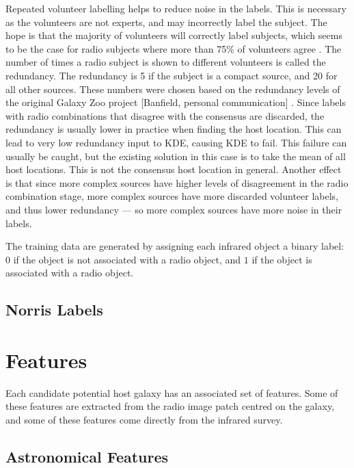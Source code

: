     Repeated volunteer labelling helps to reduce noise in the labels. This is
    necessary as the volunteers are not experts, and may incorrectly label the
    subject. The hope is that the majority of volunteers will correctly label
    subjects, which seems to be the case for radio subjects where more than
    75\% of volunteers agree \citep{banfield15}. The number of times a radio
    subject is shown to different volunteers is called the redundancy. The
    redundancy is 5 if the subject is a compact source, and 20 for all other
    sources. These numbers were chosen based on the redundancy levels of the
    original Galaxy Zoo project [Banfield, personal communication] . Since labels with radio combinations that disagree with
    the consensus are discarded, the redundancy is usually lower in practice
    when finding the host location. This can lead to very low redundancy input
    to KDE, causing KDE to fail. This failure can usually be caught, but the
    existing solution in this case is to take the mean of all host locations.
    This is not the consensus host location in general. Another effect is that
    since more complex sources have higher levels of disagreement in the radio
    combination stage, more complex sources have more discarded volunteer
    labels, and thus lower redundancy --- so more complex sources have more
    noise in their labels.

    The training data are generated by assigning each infrared object a binary label: $0$ if the object is not associated with a radio object, and $1$ if the object is associated with a radio object.

  \subsection{Norris Labels}
  \label{sec:norris}

\section{Features}
\label{sec:features}

  Each candidate potential host galaxy has an associated set of features. Some of these features are extracted from the radio image patch centred on the galaxy, and some of these features come directly from the infrared survey.

  \subsection{Astronomical Features}

